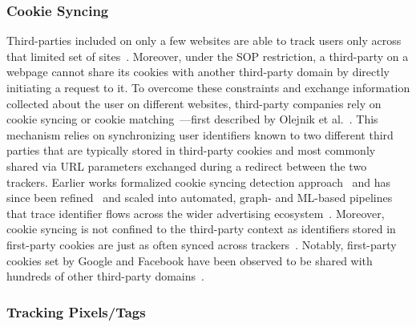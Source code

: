 \subsubsection{Cookie Syncing}
\label{sec:stateful-techniques-cookie-syncing}
Third-parties included on only a few websites are able to track users only across that limited set of sites~\cite{acarWebNeverForgets2014}.
%
Moreover, under the SOP restriction, a third-party on a webpage cannot share its cookies with another third-party domain by directly initiating a request to it.
%
To overcome these constraints and exchange information collected about the user on different websites, third-party companies rely on cookie syncing or cookie matching~\cite{acarWebNeverForgets2014}---first described by Olejnik et al.~\cite{olejnikSellingPrivacyAuction2014}. %
%
This mechanism relies on synchronizing user identifiers known to two different third parties that are typically stored in third-party cookies and most commonly shared via URL parameters exchanged during a redirect between the two trackers. %
%
Earlier works formalized cookie syncing detection approach~\cite{acarWebNeverForgets2014,englehardtOnlineTracking1millionsite2016,bashirTracingInformationFlows2016} and has since been refined~\cite{papadopoulosCookieSynchronizationEverything2019} and scaled into automated, graph- and ML-based pipelines that trace identifier flows across the wider advertising ecosystem~\cite{papadopoulosCookieSynchronizationEverything2019, iqbalKhaleesiBreakerAdvertising2022}.
%
Moreover, cookie syncing is not confined to the third-party context as identifiers stored in first-party cookies are just as often synced across trackers~\cite{sanchez-rolaJourneyCenterCookie2021}. 
%
Notably, first-party cookies set by Google and Facebook have been observed to be shared with hundreds of other third-party domains~\cite{munirCookieGraphUnderstandingDetecting2023,bahramiCOOKIEGUARDCharacterizingIsolating2024}.



\subsubsection{Tracking Pixels/Tags}
\label{sec:stateful-techniques-tags}

